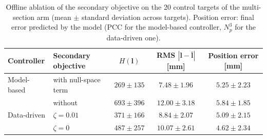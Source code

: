 \begin{table}[h]
\centering
\caption{Offline ablation of the secondary objective on the 20 control targets of the multi-section arm (mean $\pm$ standard deviation across targets). Position error: final error predicted by the model (PCC for the model-based controller, $N_p^3$ for the data-driven one).}
\label{tab:S13_ablation}
\begin{tabular}{llccc}
\toprule
Controller & Secondary objective & $H(\mathbf{l})$ & RMS $|\mathbf{l} - \bar{\mathbf{l}}|$ [mm] & Position error [mm] \\
\midrule
Model-based & with null-space term & $269 \pm 135$ & $7.48 \pm 1.96$ & $5.25 \pm 2.23$ \\
 & without & $693 \pm 396$ & $12.00 \pm 3.18$ & $5.84 \pm 1.85$ \\
\midrule
Data-driven & $\zeta = 0.01$ & $371 \pm 166$ & $8.84 \pm 2.07$ & $5.09 \pm 2.15$ \\
 & $\zeta = 0$ & $487 \pm 257$ & $10.07 \pm 2.61$ & $4.62 \pm 2.34$ \\
\bottomrule
\end{tabular}
\end{table}
